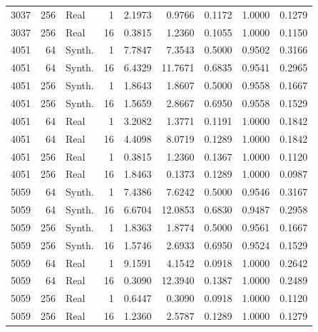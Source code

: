 \begin{longtable}{rrlrrrrrr}
3037 & 256 & Real & 1 & 2.1973 & 0.9766 & 0.1172 & 1.0000 & 0.1279\\
3037 & 256 & Real & 16 & 0.3815 & 1.2360 & 0.1055 & 1.0000 & 0.1150\\
4051 & 64 & Synth. & 1 & 7.7847 & 7.3543 & 0.5000 & 0.9502 & 0.3166\\
4051 & 64 & Synth. & 16 & 6.4329 & 11.7671 & 0.6835 & 0.9541 & 0.2965\\
4051 & 256 & Synth. & 1 & 1.8643 & 1.8607 & 0.5000 & 0.9558 & 0.1667\\
4051 & 256 & Synth. & 16 & 1.5659 & 2.8667 & 0.6950 & 0.9558 & 0.1529\\
4051 & 64 & Real & 1 & 3.2082 & 1.3771 & 0.1191 & 1.0000 & 0.1842\\
4051 & 64 & Real & 16 & 4.4098 & 8.0719 & 0.1289 & 1.0000 & 0.1842\\
4051 & 256 & Real & 1 & 0.3815 & 1.2360 & 0.1367 & 1.0000 & 0.1120\\
4051 & 256 & Real & 16 & 1.8463 & 0.1373 & 0.1289 & 1.0000 & 0.0987\\
5059 & 64 & Synth. & 1 & 7.4386 & 7.6242 & 0.5000 & 0.9546 & 0.3167\\
5059 & 64 & Synth. & 16 & 6.6704 & 12.0853 & 0.6830 & 0.9487 & 0.2958\\
5059 & 256 & Synth. & 1 & 1.8363 & 1.8774 & 0.5000 & 0.9561 & 0.1667\\
5059 & 256 & Synth. & 16 & 1.5746 & 2.6933 & 0.6950 & 0.9524 & 0.1529\\
5059 & 64 & Real & 1 & 9.1591 & 4.1542 & 0.0918 & 1.0000 & 0.2642\\
5059 & 64 & Real & 16 & 0.3090 & 12.3940 & 0.1387 & 1.0000 & 0.2489\\
5059 & 256 & Real & 1 & 0.6447 & 0.3090 & 0.0918 & 1.0000 & 0.1120\\
5059 & 256 & Real & 16 & 1.2360 & 2.5787 & 0.1289 & 1.0000 & 0.1279\\
\bottomrule\end{longtable}
